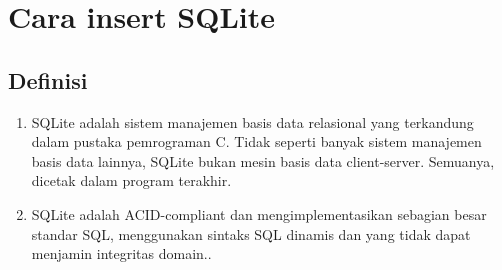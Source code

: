 \section{Cara insert SQLite}
	\subsection{Definisi}
		\begin{enumerate}
			\item SQLite adalah sistem manajemen basis data relasional yang terkandung dalam pustaka pemrograman C. Tidak seperti banyak sistem manajemen basis data lainnya, SQLite bukan mesin basis data client-server. Semuanya, dicetak dalam program terakhir.
			\item SQLite adalah ACID-compliant dan mengimplementasikan sebagian besar standar SQL, menggunakan sintaks SQL dinamis dan yang tidak dapat menjamin integritas domain..
		\end{enumerate}
